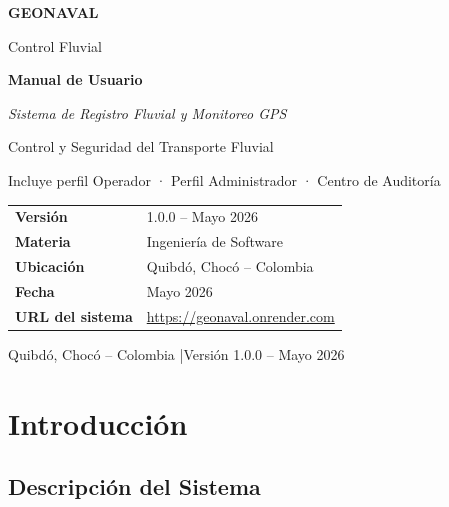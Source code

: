 \documentclass[12pt,a4paper]{article}
\begin{document}
\begin{titlepage}
  \centering
  \vspace*{2cm}

  {\Huge\bfseries\color{navyblue} GEONAVAL\par}
  \vspace{0.4cm}
  {\Large\color{gpsblue} Control Fluvial\par}
  \vspace{1.2cm}
  {\huge\bfseries Manual de Usuario\par}
  \vspace{0.6cm}
  {\large\itshape Sistema de Registro Fluvial y Monitoreo GPS\par}
  \vspace{0.4cm}
  {\normalsize Control y Seguridad del Transporte Fluvial\par}
  \vspace{0.4cm}
  {\small Incluye perfil Operador · Perfil Administrador · Centro de Auditoría\par}

  \vspace{2cm}
  \begin{tabular}{ll}
    \toprule
    \textbf{Versión}      & 1.0.0 -- Mayo 2026 \\
    \textbf{Materia}      & Ingeniería de Software \\
    \textbf{Ubicación}    & Quibdó, Chocó -- Colombia \\
    \textbf{Fecha}        & Mayo 2026 \\
    \textbf{URL del sistema} & \url{https://geonaval.onrender.com} \\
    \bottomrule
  \end{tabular}

  \vfill
  {\small Quibdó, Chocó -- Colombia \quad|\quad Versión 1.0.0 -- Mayo 2026\par}
\end{titlepage}

\tableofcontents
\newpage

\section{Introducción}

\subsection{Descripción del Sistema}
\end{document}
